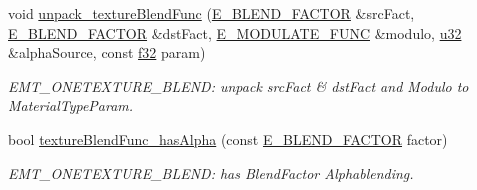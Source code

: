 \begin{DoxyCompactItemize}
void \hyperlink{namespaceirr_1_1video_a6d0644626c746278881ceae7e33e75c0}{unpack\+\_\+texture\+Blend\+Func} (\hyperlink{namespaceirr_1_1video_acae10401850a6cfd5fcf1548c6c884bc}{E\+\_\+\+B\+L\+E\+N\+D\+\_\+\+F\+A\+C\+T\+OR} \&src\+Fact, \hyperlink{namespaceirr_1_1video_acae10401850a6cfd5fcf1548c6c884bc}{E\+\_\+\+B\+L\+E\+N\+D\+\_\+\+F\+A\+C\+T\+OR} \&dst\+Fact, \hyperlink{namespaceirr_1_1video_a1402e9045137ae232fafbdf385800843}{E\+\_\+\+M\+O\+D\+U\+L\+A\+T\+E\+\_\+\+F\+U\+NC} \&modulo, \hyperlink{namespaceirr_a0416a53257075833e7002efd0a18e804}{u32} \&alpha\+Source, const \hyperlink{namespaceirr_a0277be98d67dc26ff93b1a6a1d086b07}{f32} param)
\begin{DoxyCompactList}\small\item\em E\+M\+T\+\_\+\+O\+N\+E\+T\+E\+X\+T\+U\+R\+E\+\_\+\+B\+L\+E\+ND\+: unpack src\+Fact \& dst\+Fact and Modulo to Material\+Type\+Param. \end{DoxyCompactList}\item 
\mbox{\label{namespaceirr_1_1video_a5df0764d7c9e6742eecdba61f5d8a810}} 
bool \hyperlink{namespaceirr_1_1video_a5df0764d7c9e6742eecdba61f5d8a810}{texture\+Blend\+Func\+\_\+has\+Alpha} (const \hyperlink{namespaceirr_1_1video_acae10401850a6cfd5fcf1548c6c884bc}{E\+\_\+\+B\+L\+E\+N\+D\+\_\+\+F\+A\+C\+T\+OR} factor)
\begin{DoxyCompactList}\small\item\em E\+M\+T\+\_\+\+O\+N\+E\+T\+E\+X\+T\+U\+R\+E\+\_\+\+B\+L\+E\+ND\+: has Blend\+Factor Alphablending. \end{DoxyCompactList}\end{DoxyCompactItemize}
